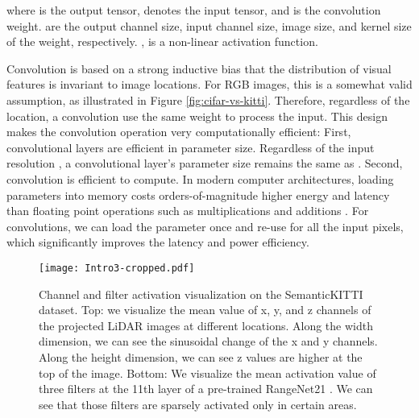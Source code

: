 \documentclass[runningheads]{llncs}
\begin{document}
where  is the output tensor,  denotes the input tensor, and  is the convolution weight.  are the output channel size, input channel size, image size, and kernel size of the weight, respectively. ,   is a non-linear activation function. 

Convolution is based on a strong inductive bias that the distribution of visual features is invariant to image locations. For RGB images, this is a somewhat valid assumption, as illustrated in Figure \ref{fig:cifar-vs-kitti}. Therefore, regardless of the location, a convolution use the same weight  to process the input. This design makes the convolution operation very computationally efficient: First, convolutional layers are efficient in parameter size. Regardless of the input resolution , a convolutional layer's parameter size remains the same as . Second, convolution is efficient to compute. In modern computer architectures, loading parameters into memory costs orders-of-magnitude higher energy and latency than floating point operations such as multiplications and additions 
\cite{pedram2016dark}. 
For convolutions, we can load the parameter once and re-use for all the input pixels, which significantly improves the latency and power efficiency. 

\begin{figure*}[ht]
\centering
\texttt{[image: Intro3-cropped.pdf]}
\caption{Channel and filter activation visualization on the SemanticKITTI dataset. Top: we visualize the mean value of x, y, and z channels of the projected LiDAR images at different locations. Along the width dimension, we can see the sinusoidal change of the x and y channels. Along the height dimension, we can see z values are higher at the top of the image. Bottom: We visualize the mean activation value of three filters at the 11th layer of a pre-trained RangeNet21 \cite{milioto2019rangenet++}. We can see that those filters are sparsely activated only in certain areas.}
\label{fig:kitti-activation}
\centering
\end{figure*}
\end{document}
